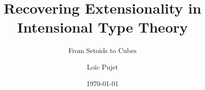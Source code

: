 \documentclass[
	a4paper, %
	fontsize=10pt, %
	twoside=false, %
	numbers=noenddot, %
]{kaobook}
\begin{document}


\titlehead{Recovering Extensionality in Intensional Type Theory}
\subject{Thèse de Doctorat}

\title[Recovering Extensionality in Intensional Type Theory]{Recovering Extensionality in Intensional Type Theory}
\subtitle{From Setoids to Cubes}

\author[Loïc Pujet]{Loïc Pujet}

\date{\today}

\publishers{École Doctorale MathSTIC}


\frontmatter %





\end{document}
